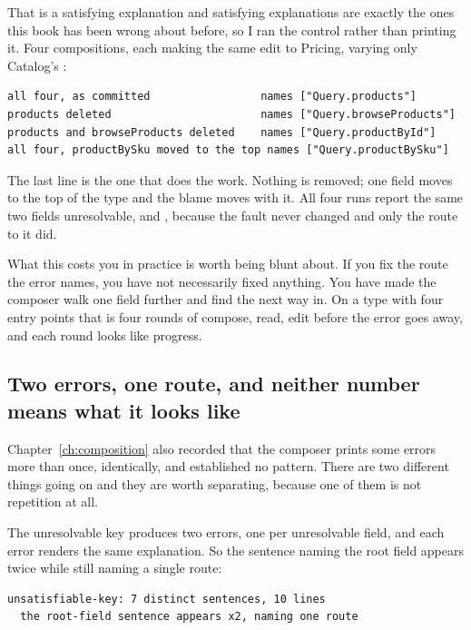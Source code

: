 %
That is a satisfying explanation and satisfying explanations are exactly the
ones this book has been wrong about before, so I ran the control rather than
printing it. Four compositions, each making the same edit to Pricing, varying
only Catalog's :

\begin{verbatim}
all four, as committed                 names ["Query.products"]
products deleted                       names ["Query.browseProducts"]
products and browseProducts deleted    names ["Query.productById"]
all four, productBySku moved to the top names ["Query.productBySku"]
\end{verbatim}

The last line is the one that does the work. Nothing is removed; one field moves
to the top of the type and the blame moves with it. All four runs report the
same two fields unresolvable,  and , because the
fault never changed and only the route to it did.

%
What this costs you in practice is worth being blunt about. If you fix the route
the error names, you have not necessarily fixed anything. You have made the
composer walk one field further and find the next way in. On a type with four
entry points that is four rounds of compose, read, edit before the error goes
away, and each round looks like progress.

\subsection*{Two errors, one route, and neither number means what it looks like}

%
Chapter~\ref{ch:composition} also recorded that the composer prints some errors
more than once, identically, and established no pattern. There are two different
things going on and they are worth separating, because one of them is not
repetition at all.

The unresolvable key produces two errors, one per unresolvable field, and each
error renders the same explanation. So the sentence naming the root field
appears twice while still naming a single route:

\begin{verbatim}
unsatisfiable-key: 7 distinct sentences, 10 lines
  the root-field sentence appears x2, naming one route
\end{verbatim}


